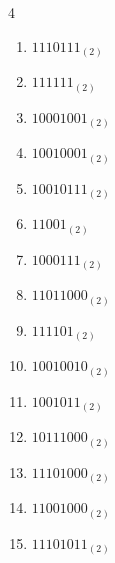\begin{multicols}{4}
\begin{enumerate}
        \phantom{$=208$}

  \item $1110111_{(2)}$

        \phantom{$=119$}

\columnbreak %

  \item $111111_{(2)}$

        \phantom{$=63$}

  \item $10001001_{(2)}$

        \phantom{$=137$}

  \item $10010001_{(2)}$

        \phantom{$=145$}

  \item $10010111_{(2)}$

        \phantom{$=151$}

  \item $11001_{(2)}$

        \phantom{$=25$}

  \item $1000111_{(2)}$

        \phantom{$=71$}

  \item $11011000_{(2)}$

        \phantom{$=216$}

  \item $111101_{(2)}$

        \phantom{$=61$}

  \item $10010010_{(2)}$

        \phantom{$=146$}

  \item $1001011_{(2)}$

        \phantom{$=75$}

  \item $10111000_{(2)}$

        \phantom{$=184$}

  \item $11101000_{(2)}$

        \phantom{$=232$}

  \item $11001000_{(2)}$

        \phantom{$=200$}

  \item $11101011_{(2)}$


\end{enumerate}
\end{multicols}

